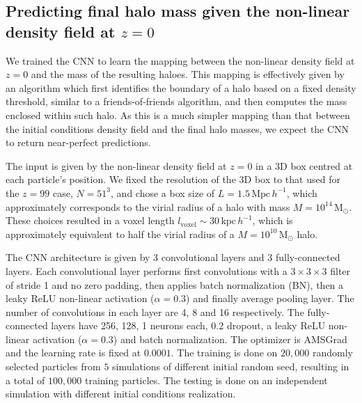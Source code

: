 \documentclass[11pt]{article}
\begin{document}
\subsection{Predicting final halo mass given the non-linear density field at $z=0$}
\label{sec:z0_training}

We trained the CNN to learn the mapping between the non-linear density field at $z=0$ and the mass of the resulting haloes. This mapping is effectively given by an algorithm which first identifies the boundary of a halo based on a fixed density threshold, similar to a friends-of-friends algorithm, and then computes the mass enclosed within such halo. As this is a much simpler mapping than that between the initial conditions density field and the final halo masses, we expect the CNN to return near-perfect predictions. 

The input is given by the non-linear density field at $z=0$ in a 3D box centred at each particle's position. We fixed the resolution of the 3D box to that used for the $z=99$ case, $N=51^3$, and chose a box size of $L=1.5 \, \mathrm{Mpc} \, h^{-1}$, which approximately corresponds to the virial radius of a halo with mass $M=10^{14}\, \mathrm{M}_\odot$. These choices resulted in a voxel length $l_\mathrm{voxel} \sim 30 \, \mathrm{kpc} \, h^{-1}$, which is approximately equivalent to half the virial radius of a $M=10^{10}\, \mathrm{M}_\odot$ halo. 

The CNN architecture is given by 3 convolutional layers and 3 fully-connected layers. Each convolutional layer performs first convolutions with a $3\times3\times3$ filter of stride 1 and no zero padding, then applies batch normalization (BN), then a leaky ReLU non-linear activation ($\alpha=0.3$) and finally average pooling layer. The number of convolutions in each layer are 4, 8 and 16 respectively. The fully-connected layers have 256, 128, 1 neurons each, $0.2$ dropout, a leaky ReLU non-linear activation ($\alpha=0.3$) and batch normalization. The optimizer is AMSGrad and the learning rate is fixed at $0.0001$. The training is done on $20,000$ randomly selected particles from $5$ simulations of different initial random seed, resulting in a total of $100,000$ training particles. The testing is done on an independent simulation with different initial conditions realization. 
\end{document}
